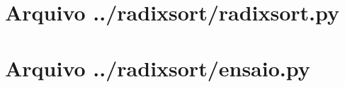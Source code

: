 \documentclass[12pt,a4paper,twoside]{report}
\begin{document}
\clearpage
\clearpage
{}
\appendix

\chapter{Arquivo ../radixsort/radixsort.py \label{ap:radixsort}}


\chapter{Arquivo ../radixsort/ensaio.py \label{ap:radixsortensaio}}

\end{document}

